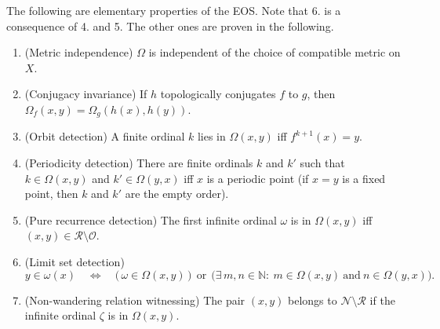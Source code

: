 \documentclass[10pt,a4paper]{article}
\theoremstyle{definition}
\theoremstyle{remark}
\theoremstyle{plain}
\begin{document}
The following are elementary properties of the EOS. Note that 6. is a consequence of 4. and 5. The other ones are proven in the following.
\begin{enumerate}
\item (Metric independence) $\Omega$ is independent of the choice of compatible metric on $X$.
\item (Conjugacy invariance) If $h$ topologically conjugates $f$ to $g$, then
$\Omega_f(x,y)=\Omega_g(h(x),h(y))$.
\item (Orbit detection) A finite ordinal $k$ lies in $\Omega(x,y)$
iff $f^{k+1}(x)=y$.
\item (Periodicity detection) There are finite ordinals $k$ and $k'$ such that $k\in\Omega(x,y)$ and $k'\in\Omega(y,x)$ iff $x$ is a periodic point (if $x=y$ is a fixed point, then $k$ and $k'$ are the empty order).
\item (Pure recurrence detection) The first infinite ordinal $\omega$ is in $\Omega(x,y)$ iff $(x,y)\in \mathcal{R}\setminus\mathcal{O}$.
\item (Limit set detection) 
$$
y\in\omega(x)\quad\Longleftrightarrow\quad
\Big(\,\omega\in\Omega(x,y)\,\Big)\ \ \text{or}\ \ \Big(\exists\,m,n \in\mathbb{N}:\ m\in\Omega(x,y)\ \text{and}\ n\in\Omega(y,x)\Big).
$$
\item (Non-wandering relation witnessing) The pair $(x,y)$ belongs to $\mathcal{N}\setminus\mathcal{R}$ if the infinite ordinal $\zeta$ is in $\Omega(x,y)$.
\end{enumerate}
\end{document}
